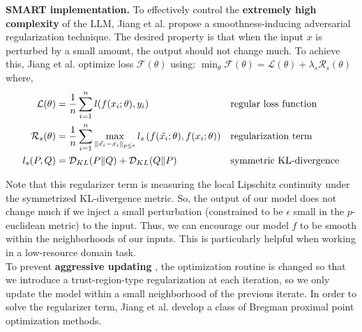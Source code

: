 \documentclass{article}
\begin{document}
\textbf{SMART implementation.} To effectively control the \textbf{extremely high complexity} of the LLM, Jiang et al. \cite{smart} propose a smoothness-inducing adversarial regularization technique. The desired property is that when the input $x$ is perturbed by a small amount, the output should not change much. To achieve this, Jiang et al. \cite{smart} optimize loss $\mathcal{F}(\theta)$ using: $\min_{\theta} \mathcal{F}(\theta) = \mathcal{L}(\theta) + \lambda_{s}\mathcal{R}_{s}(\theta)$ where,
\begin{align*}
\mathcal{L}(\theta) & = \frac{1}{n} \sum_{i=1}^{n} l(f(x_{i};\theta), y_{i}) && \text{regular loss function} \\
\mathcal{R}_{s}(\theta) & = \frac{1}{n} \sum_{i=1}^{n} \max_{\lVert \Tilde{x_{i}} - x_{i} \rVert_{p \leq \epsilon}} l_{s}\left(f(\Tilde{x_{i}}; \theta), f(x_{i}; \theta)\right) && \text{regularization term}\\
l_{s}(P, Q) & = \mathcal{D}_{KL}(P \lVert Q) + \mathcal{D}_{KL}(Q \lVert P) && \text{symmetric KL-divergence}
\end{align*} 

Note that this regularizer term is measuring the local Lipschitz continuity under the symmetrized KL-divergence metric. So, the output of our model does not change much if we inject a small perturbation (constrained to be $\epsilon$ small in the $p$-euclidean metric) to the input. Thus, we can encourage our model $f$ to be smooth within the neighborhoods of our inputs. This is particularly helpful when working in a low-resource domain task. \\

To prevent \textbf{aggressive updating} , the optimization routine is changed so that we introduce a trust-region-type regularization at each iteration, so we only update the model within a small neighborhood of the previous iterate. In order to solve the regularizer term, Jiang et al. \cite{smart} develop a class of Bregman proximal point optimization methods. 

\end{document}
